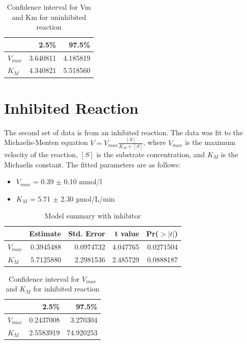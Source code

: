 \documentclass{article}
\begin{document}
\begin{table}[H]

    \caption{Confidence interval for Vm and Km for uninhibited reaction}
    \centering
    \begin{tabular}[t]{l|r|r}
        \hline
                  & 2.5\%    & 97.5\%   \\
        \hline
        $V_{max}$ & 3.640811 & 4.185819 \\
        \hline
        $K_{M}$   & 4.340821 & 5.518560 \\
        \hline
    \end{tabular}
\end{table}

\section{Inhibited Reaction}

The second set of data is from an inhibited reaction. The data was fit to the Michaelis-Menten
equation $V = V_{max}\displaystyle \frac{[S]}{K_{M} + [S]}$, where $V_{max}$ is the maximum velocity of the
reaction, $[S]$ is the substrate concentration, and $K_{M}$ is the Michaelis constant. The
fitted parameters are as follows:
\begin{itemize}
    \item $V_{max}$ = 0.39 $\pm$ 0.10 mmol/l
    \item $K_{M}$ = 5.71 $\pm$ 2.30 µmol/L/min
\end{itemize}

\begin{table}[H]

    \caption{Model summary with inhibitor}
    \centering
    \begin{tabular}[t]{l|r|r|r|r}
        \hline
                  & Estimate  & Std. Error & t value  & Pr($>|t|$) \\
        \hline
        $V_{max}$ & 0.3945488 & 0.0974732  & 4.047765 & 0.0271504  \\
        \hline
        $K_{M}$   & 5.7125880 & 2.2981536  & 2.485729 & 0.0888187  \\
        \hline
    \end{tabular}
\end{table}

\begin{table}[H]

    \caption{Confidence interval for $V_{max}$ and $K_{M}$ for inhibited reaction}
    \centering
    \begin{tabular}[t]{l|r|r}
        \hline
                  & 2.5\%     & 97.5\%    \\
        \hline
        $V_{max}$ & 0.2437008 & 3.270304  \\
        \hline
        $K_{M}$   & 2.5583919 & 74.920253 \\
        \hline
    \end{tabular}
\end{table}
\end{document}
